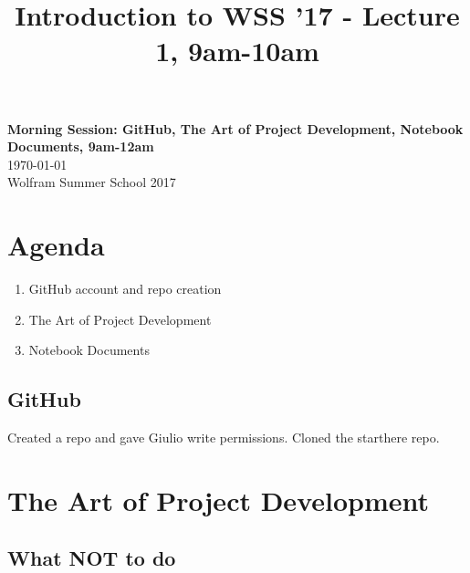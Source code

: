 \documentclass[11pt]{article}
\theoremstyle{definition}
\begin{document}
\title{Introduction to WSS '17 - Lecture 1, 9am-10am}

\thispagestyle{empty}
\begin{center}
{\LARGE \bf Morning Session: GitHub, The Art of Project Development, Notebook Documents, 9am-12am}\\
\medskip
{\Large \today}\\
\smallskip
{\large Wolfram Summer School 2017}
\end{center}





\section*{Agenda}
\begin{enumerate}
\item GitHub account and repo creation
\item The Art of Project Development
\item Notebook Documents
\end{enumerate}

\noindent\hrulefill




\subsection{GitHub}

Created a repo and gave Giulio write permissions. Cloned the starthere repo.

\section{The Art of Project Development}

\subsection{What NOT to do}
\end{document}
